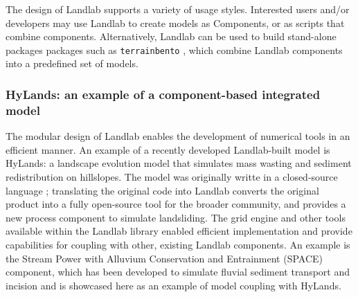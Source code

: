 \documentclass{article} %
\begin{document}
The design of Landlab supports a variety of usage styles. Interested users and/or developers may use Landlab to create models as Components, or as scripts that combine components. Alternatively, Landlab can be used to build stand-alone packages packages such as \texttt{terrainbento} \citep{barnhart2019terrainbento}, which combine Landlab components into a predefined set of models.




\subsubsection{HyLands: an example of a component-based integrated model}
  
The modular design of Landlab enables the development of numerical tools in an efficient manner. An example of a recently developed Landlab-built model is HyLands: a landscape evolution model that simulates mass wasting and sediment redistribution on hillslopes. The model was originally writte in a closed-source language \citep{campforts2020hylands}; translating the original code into Landlab converts the original product into a fully  open-source tool for the broader community, and provides a new process component to simulate landsliding. The grid engine and other tools available within the Landlab library enabled efficient implementation and provide capabilities for coupling with other, existing Landlab components. An example is the Stream Power with Alluvium Conservation and Entrainment (SPACE) component, which has been developed to simulate fluvial sediment transport and incision \citep{shobe2017space} and is showcased here as an example of model coupling with HyLands. 
\end{document}
